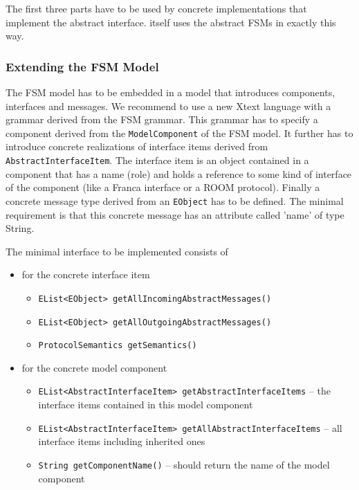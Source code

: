 The first three parts have to be used by concrete implementations that implement the abstract interface.
\eTrice{} itself uses the abstract FSMs in exactly this way.

\subsubsection{Extending the FSM Model}

The \eTrice{} FSM model has to be embedded in a model that introduces components, interfaces and messages.
We recommend to use a new Xtext language with a grammar derived from the FSM grammar.
This grammar has to specify a component derived from the \texttt{ModelComponent} of the FSM model.
It further has to introduce concrete realizations of interface items derived from \texttt{AbstractInterfaceItem}.
The interface item is an object contained in a component that has a name (role) and holds a reference to some kind of interface of the
component (like a Franca interface or a ROOM protocol).
Finally a concrete message type derived from an \texttt{EObject} has to be defined. The minimal requirement is that this concrete message
has an attribute called 'name' of type String.

The minimal interface to be implemented consists of
\begin{itemize}
	\item for the concrete interface item
	\begin{itemize}
		\item \texttt{EList<EObject> getAllIncomingAbstractMessages()}
		\item \texttt{EList<EObject> getAllOutgoingAbstractMessages()}
		\item \texttt{ProtocolSemantics getSemantics()}
	\end{itemize}
	\item for the concrete model component
	\begin{itemize}
		\item \texttt{EList<AbstractInterfaceItem> getAbstractInterfaceItems} -- the interface items contained in this model component
		\item \texttt{EList<AbstractInterfaceItem> getAllAbstractInterfaceItems} -- all interface items including inherited ones
		\item \texttt{String getComponentName()} -- should return the name of the model component
	\end{itemize}
\end{itemize}

